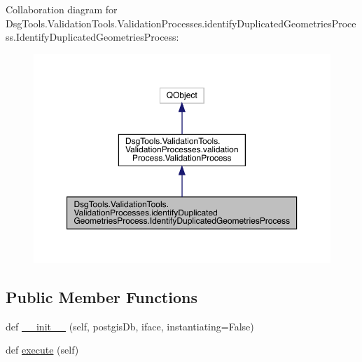 Collaboration diagram for Dsg\+Tools.\+Validation\+Tools.\+Validation\+Processes.\+identify\+Duplicated\+Geometries\+Process.\+Identify\+Duplicated\+Geometries\+Process\+:
\nopagebreak
\begin{figure}[H]
\begin{center}
\leavevmode
\includegraphics[width=350pt]{class_dsg_tools_1_1_validation_tools_1_1_validation_processes_1_1identify_duplicated_geometries_dcfc82aeb734d2bfc984b21b6adf95da}
\end{center}
\end{figure}
\subsection*{Public Member Functions}
\begin{DoxyCompactItemize}
\item 
def \mbox{\hyperlink{class_dsg_tools_1_1_validation_tools_1_1_validation_processes_1_1identify_duplicated_geometries_55f3ef122508ca76ef1215b3f842280d_ac404e8bd0c6e0c038e30c51bd9c5bfc9}{\+\_\+\+\_\+init\+\_\+\+\_\+}} (self, postgis\+Db, iface, instantiating=False)
\item 
def \mbox{\hyperlink{class_dsg_tools_1_1_validation_tools_1_1_validation_processes_1_1identify_duplicated_geometries_55f3ef122508ca76ef1215b3f842280d_aecfd6be3d352a2e2c1888f25aa80ddfb}{execute}} (self)
\end{DoxyCompactItemize}
